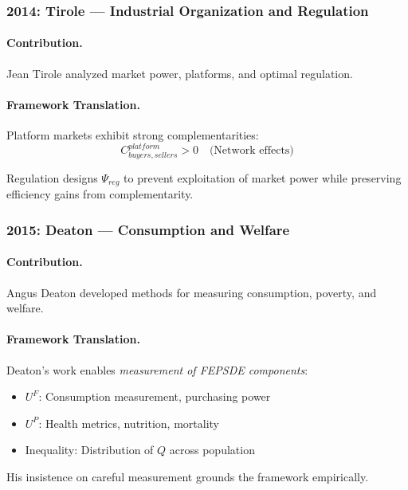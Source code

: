 \subsubsection{2014: Tirole --- Industrial Organization and Regulation}

\paragraph{Contribution.}
Jean Tirole \citep{tirole1988} analyzed market power, platforms, and optimal regulation.

\paragraph{Framework Translation.}
Platform markets exhibit strong complementarities:
\begin{equation}
  C_{buyers, sellers}^{platform} > 0 \quad \text{(Network effects)}
\end{equation}

Regulation designs $\Psi_{reg}$ to prevent exploitation of market power
while preserving efficiency gains from complementarity.

\subsubsection{2015: Deaton --- Consumption and Welfare}

\paragraph{Contribution.}
Angus Deaton developed methods for measuring consumption, poverty, and welfare.

\paragraph{Framework Translation.}
Deaton's work enables \emph{measurement of FEPSDE components}:
\begin{itemize}
  \item $U^F$: Consumption measurement, purchasing power
  \item $U^P$: Health metrics, nutrition, mortality
  \item Inequality: Distribution of $Q$ across population
\end{itemize}

His insistence on careful measurement grounds the framework empirically.

